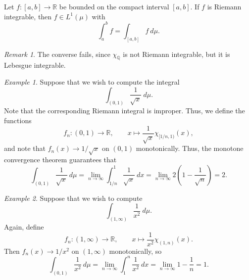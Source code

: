 \documentclass[11pt]{article}
\newcommand{\R}{\mathbb{R}}
\newcommand{\Q}{\mathbb{Q}}
\theoremstyle{definition}
\theoremstyle{remark}
\newtheorem*{remark}{Remark}
\newtheorem*{example}{Example}
\numberwithin{equation}{section}
\begin{document}
    \begin{theorem}
        Let $f\colon [a, b] \to \R$ be bounded on the compact interval $[a, b]$. If
        $f$ is Riemann integrable, then $f \in L^1(\mu)$ with \[
            \int_a^b f = \int_{[a, b]} f\:d\mu.
        \] 
        \begin{remark}
            The converse fails, since $\chi_\Q$ is not Riemann integrable, but it is
            Lebesgue integrable.
        \end{remark}
    \end{theorem}
    \begin{example}
        Suppose that we wish to compute the integral \[
            \int_{(0, 1)} \frac{1}{\sqrt{x}}\:d\mu.
        \] Note that the corresponding Riemann integral is improper. Thus, we define
        the functions \[
            f_n\colon (0, 1) \to \R, \qquad 
            x \mapsto \frac{1}{\sqrt{x}}\chi_{[1 / n, 1)}(x),
        \] and note that $f_n(x) \to 1 / \sqrt{x}$ on $(0, 1)$ monotonically.
        Thus, the monotone convergence theorem guarantees that \[
            \int_{(0, 1)} \frac{1}{\sqrt{x}}\:d\mu = \lim_{n \to \infty} \int_{1 /
            n}^1 \frac{1}{\sqrt{x}}\:dx = \lim_{n \to \infty} 2 \left( 1 -
            \frac{1}{\sqrt{n}} \right) = 2.
        \]
    \end{example}
    \begin{example}
        Suppose that we wish to compute \[
            \int_{(1, \infty)} \frac{1}{x^2}\:d\mu.
        \] Again, define \[
            f_n\colon (1, \infty) \to \R, \qquad x \mapsto \frac{1}{x^2}\chi_{(1,
            n)}(x).
        \] Then $f_n(x) \to 1 / x^2$ on $(1, \infty)$ monotonically, so \[
            \int_{(0, 1)} \frac{1}{x^2}\:d\mu = \lim_{n \to \infty} \int_1^n
            \frac{1}{x^2}\:dx = \lim_{n \to \infty} 1 - \frac{1}{n} = 1.
        \] 
    \end{example}
\end{document}
